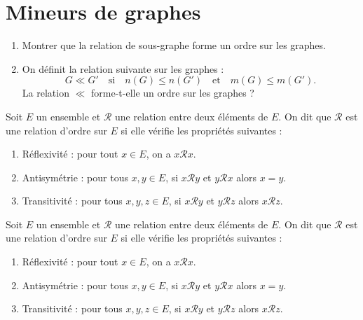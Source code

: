 \section{Mineurs de graphes}\label{sec:mineurs-de-graphes}

\begin{td-exo}
    \begin{enumerate}
        \item Montrer que la relation de sous-graphe forme un ordre sur les graphes.
        \item On définit la relation suivante sur les graphes :
        \begin{equation*}
            G \ll G' \quad\text{si}\quad n(G) \le n(G') \quad\text{et}\quad m(G) \le m(G').
        \end{equation*}
        La relation \(\ll\) forme-t-elle un ordre sur les graphes ?
    \end{enumerate}


        
        \begin{definition}
            Soit \(E\) un ensemble et \(\mathcal{R}\) une relation entre deux éléments de \(E\).
            On dit que \(\mathcal{R}\) est une relation d'ordre sur \(E\) si elle vérifie les propriétés suivantes :
            \begin{enumerate}[label=\roman*)]
                \item Réflexivité : pour tout \(x \in E\), on a \(x\mathcal{R}x\).
                \item Antisymétrie : pour tous \(x,y\in E\), si \(x\mathcal{R}y\) et \(y\mathcal{R}x\) alors \(x = y\).
                \item Transitivité : pour tous \(x,y,z\in E\), si \(x\mathcal{R}y\) et \(y\mathcal{R}z\) alors \(x\mathcal{R}z\).
            \end{enumerate}
        \end{definition}
\end{td-exo}


        
        \begin{definition}
            Soit \(E\) un ensemble et \(\mathcal{R}\) une relation entre deux éléments de \(E\).
            On dit que \(\mathcal{R}\) est une relation d'ordre sur \(E\) si elle vérifie les propriétés suivantes :
            \begin{enumerate}[label=\roman*)]
                \item Réflexivité : pour tout \(x \in E\), on a \(x\mathcal{R}x\).
                \item Antisymétrie : pour tous \(x,y\in E\), si \(x\mathcal{R}y\) et \(y\mathcal{R}x\) alors \(x = y\).
                \item Transitivité : pour tous \(x,y,z\in E\), si \(x\mathcal{R}y\) et \(y\mathcal{R}z\) alors \(x\mathcal{R}z\).
            \end{enumerate}
        \end{definition}


